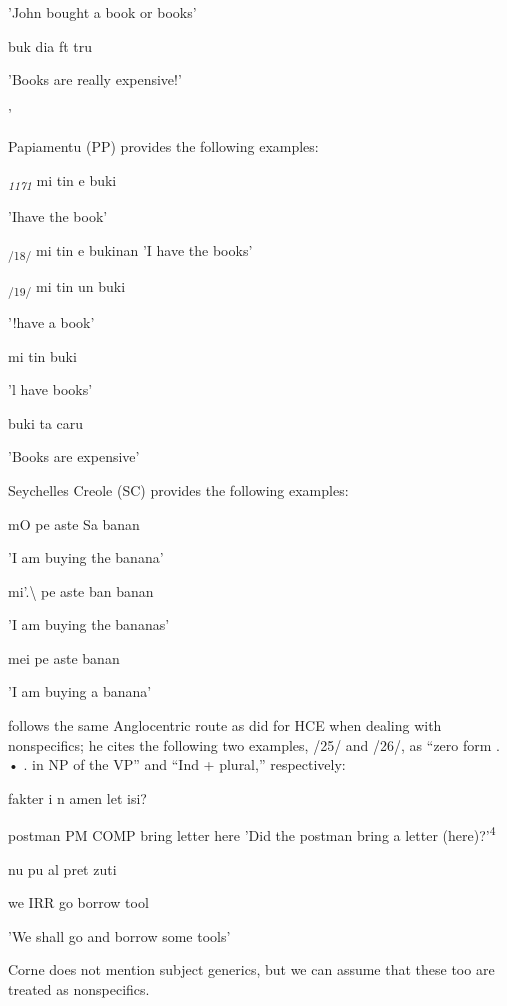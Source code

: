 'John bought a book or books'

\ea\label{ex:16}
 buk dia ft tru
\glt
\z

'Books are really expensive!'

'


Papiamentu (PP) provides the following examples:

\textit{\textsubscript{1171}}\textsubscript{ }mi tin e buki

'Ihave the book'

\textsubscript{/18}\textsubscript{/}\textsubscript{ }mi tin e bukinan 'I have the books'

\textsubscript{/1}\textsubscript{9/}\textsubscript{ }mi tin un buki

'!have a book'

\ea\label{ex:20}
mi tin buki
\glt
\z

'l have books'

\ea\label{ex:21}
buki ta caru
\glt
\z

'Books are expensive'

Seychelles Creole (SC) provides the following examples:

\ea\label{ex:22}
 mO pe aste Sa banan
\glt
\z

'I am buying the banana'

\ea\label{ex:23}
 mi'.{\textbackslash} pe aste ban banan
\glt
\z

'I am buying the bananas'

\ea\label{ex:24}
 mei pe aste banan
\glt
\z

'I am buying a banana'

\citet[13]{Corne1977} follows the same Anglocentric route as \citet{Perlman1973} did for HCE when dealing with nonspecifics; he cites the follow\-ing two examples, /25/ and /26/, as ``zero form . • . in NP of the VP'' and ``Ind + plural,'' respectively:

\ea\label{ex:25}
 fakter i n amen let isi?
\glt
\z

postman PM COMP bring letter here 'Did the postman bring a letter (here)?'\textsuperscript{4}

\ea\label{ex:26}
 nu pu al pret zuti
\glt
\z

we IRR go borrow tool

'We shall go and borrow some tools'

Corne does not mention subject generics, but we can assume that these too are treated as nonspecifics.

